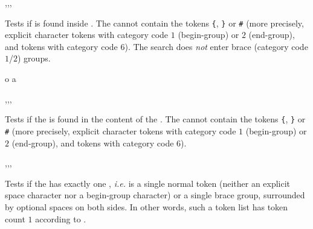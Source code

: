 \documentclass[oneside]{book}
\begin{document}
\begin{function}{\tlIfIn,\tlIfInT,\tlIfInF,\tlIfInTF}
\begin{syntax}
  
   
   
    
\end{syntax}
Tests if  is found inside .
The  cannot contain the tokens \verb|{|, \verb|}| or \verb|#|
(more precisely, explicit character tokens with category code $1$
(begin-group) or $2$ (end-group), and tokens with category code $6$).
The search does \emph{not} enter brace (category code $1$/$2$) groups.
\begin{demohigh}
 {o} {} {}
 {a} {} {}
\end{demohigh}
\end{function}

\begin{function}{\tlVarIfIn,\tlVarIfInT,\tlVarIfInF,\tlVarIfInTF}
\begin{syntax}
  
   
   
    
\end{syntax}
Tests if the  is found in the content of the
. The  cannot contain
the tokens \verb|{|, \verb|}| or \verb|#|
(more precisely, explicit character tokens with category code $1$
(begin-group) or $2$ (end-group), and tokens with category code $6$).
\begin{demohigh}
\tlSet {}
\tlVarIfInTF {} {} {}
\tlVarIfInTF {} {} {}
\end{demohigh}
\end{function}

\begin{function}{\tlIfSingle,\tlIfSingleT,\tlIfSingleF,\tlIfSingleTF}
\begin{syntax}
 
  
  
   
\end{syntax}
Tests if the  has exactly one , \emph{i.e.} is
a single normal token (neither an explicit space character nor a
begin-group character) or a single brace group, surrounded by
optional spaces on both sides. In other words, such a token list has
token count $1$ according to .
\begin{demohigh}
 {} {}
 {} {}
\end{demohigh}
\end{function}
\end{document}
